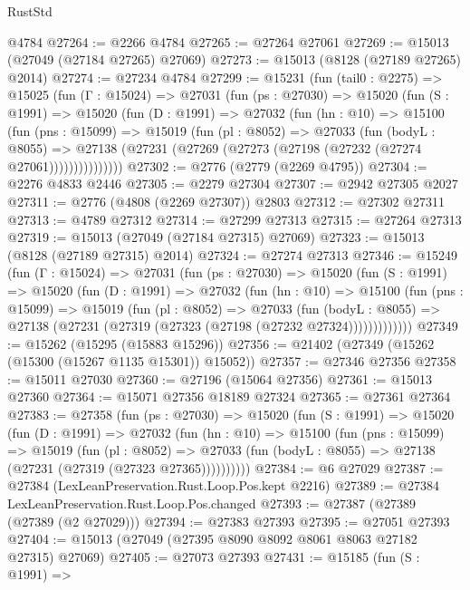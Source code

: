 \begin{lexlean}{RustStd}
\begin{coremodule}
    @4784
@27264 := @2266 @4784
@27265 := @27264 @27061
@27269 := @15013 (@27049 (@27184 @27265) @27069)
@27273 := @15013 (@8128 (@27189 @27265) @2014)
@27274 := @27234 @4784
@27299 := @15231
    (fun (tail0 : @2275) =>
    @15025
      (fun (Γ : @15024) =>
      @27031
        (fun (ps : @27030) =>
        @15020
          (fun (S : @1991) =>
          @15020
            (fun (D : @1991) =>
            @27032
              (fun (hn : @10) =>
              @15100
                (fun (pns : @15099) =>
                @15019
                  (fun (pl : @8052) =>
                  @27033
                    (fun (bodyL : @8055) =>
                    @27138 (@27231 (@27269 (@27273 (@27198 (@27232 (@27274 @27061)))))))))))))))
@27302 := @2776 (@2779 (@2269 @4795))
@27304 := @2276 @4833 @2446
@27305 := @2279 @27304
@27307 := @2942 @27305 @2027
@27311 := @2776 (@4808 (@2269 @27307)) @2803
@27312 := @27302 @27311
@27313 := @4789 @27312
@27314 := @27299 @27313
@27315 := @27264 @27313
@27319 := @15013 (@27049 (@27184 @27315) @27069)
@27323 := @15013 (@8128 (@27189 @27315) @2014)
@27324 := @27274 @27313
@27346 := @15249
    (fun (Γ : @15024) =>
    @27031
      (fun (ps : @27030) =>
      @15020
        (fun (S : @1991) =>
        @15020
          (fun (D : @1991) =>
          @27032
            (fun (hn : @10) =>
            @15100
              (fun (pns : @15099) =>
              @15019
                (fun (pl : @8052) =>
                @27033
                  (fun (bodyL : @8055) =>
                  @27138 (@27231 (@27319 (@27323 (@27198 (@27232 @27324)))))))))))))
@27349 := @15262 (@15295 (@15883 @15296))
@27356 := @21402 (@27349 (@15262 (@15300 (@15267 @1135 @15301)) @15052))
@27357 := @27346 @27356
@27358 := @15011 @27030
@27360 := @27196 (@15064 @27356)
@27361 := @15013 @27360
@27364 := @15071 @27356 @18189 @27324
@27365 := @27361 @27364
@27383 := @27358
    (fun (ps : @27030) =>
    @15020
      (fun (S : @1991) =>
      @15020
        (fun (D : @1991) =>
        @27032
          (fun (hn : @10) =>
          @15100
            (fun (pns : @15099) =>
            @15019
              (fun (pl : @8052) =>
              @27033 (fun (bodyL : @8055) => @27138 (@27231 (@27319 (@27323 @27365))))))))))
@27384 := @6 @27029
@27387 := @27384 (LexLeanPreservation.Rust.Loop.Pos.kept @2216)
@27389 := @27384 LexLeanPreservation.Rust.Loop.Pos.changed
@27393 := @27387 (@27389 (@27389 (@2 @27029)))
@27394 := @27383 @27393
@27395 := @27051 @27393
@27404 := @15013 (@27049 (@27395 @8090 @8092 @8061 @8063 @27182 @27315) @27069)
@27405 := @27073 @27393
@27431 := @15185
    (fun (S : @1991) =>

\end{coremodule}
\end{lexlean}
